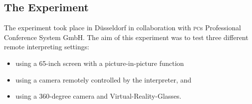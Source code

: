 \documentclass[output=paper]{langsci/langscibook}
\begin{document}
\subsection{The Experiment}
\label{sub:ziegler:6.1}
The experiment took place in Düsseldorf in collaboration with \textsc{pc}s Professional Conference System GmbH. The aim of this experiment was to test three different remote interpreting settings: 

\begin{itemize}
\item using a 65-inch screen with a picture-in-picture function 
\item using a camera remotely controlled by the interpreter, and
\item using a 360-degree camera and Virtual-Reality-Glasses. 
\end{itemize}
\end{document}
